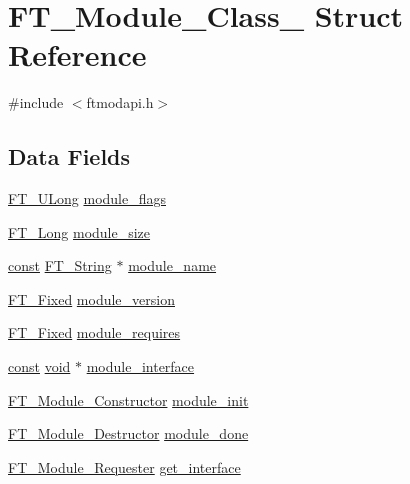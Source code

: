 \hypertarget{struct_f_t___module___class__}{}\section{F\+T\+\_\+\+Module\+\_\+\+Class\+\_\+ Struct Reference}
\label{struct_f_t___module___class__}


{\ttfamily \#include $<$ftmodapi.\+h$>$}

\subsection*{Data Fields}
\begin{DoxyCompactItemize}
\item 
\hyperlink{fttypes_8h_a4fac88bdba78eb76b505efa6e4fbf3f5}{F\+T\+\_\+\+U\+Long} \hyperlink{struct_f_t___module___class___a54a02a3767955cd8fa0cd786bd1f9515}{module\+\_\+flags}
\item 
\hyperlink{fttypes_8h_a7fa72a1f0e79fb1860c5965789024d6f}{F\+T\+\_\+\+Long} \hyperlink{struct_f_t___module___class___a2582eeab364e4fbbd5d1e420bfcf3207}{module\+\_\+size}
\item 
\hyperlink{zconf_8h_a2c212835823e3c54a8ab6d95c652660e}{const} \hyperlink{fttypes_8h_a9846214585359eb2ba6bbb0e6de30639}{F\+T\+\_\+\+String} $\ast$ \hyperlink{struct_f_t___module___class___af25b9e32b6c91e0c31560efb62886ed7}{module\+\_\+name}
\item 
\hyperlink{fttypes_8h_a5f5a679cc09f758efdd0d1c5feed3c3d}{F\+T\+\_\+\+Fixed} \hyperlink{struct_f_t___module___class___a5b649f1965c42fd8c54bbc370fbf60b4}{module\+\_\+version}
\item 
\hyperlink{fttypes_8h_a5f5a679cc09f758efdd0d1c5feed3c3d}{F\+T\+\_\+\+Fixed} \hyperlink{struct_f_t___module___class___a24772981bd972d342f54a6e1704f85c3}{module\+\_\+requires}
\item 
\hyperlink{zconf_8h_a2c212835823e3c54a8ab6d95c652660e}{const} \hyperlink{png_8h_ac9c84fa68bbad002983e35ce3663c686}{void} $\ast$ \hyperlink{struct_f_t___module___class___a320168f227e2d268691429ac0c6b2900}{module\+\_\+interface}
\item 
\hyperlink{ftmodapi_8h_ae0a0ec80683e4845d953fcbb7e6af093}{F\+T\+\_\+\+Module\+\_\+\+Constructor} \hyperlink{struct_f_t___module___class___a60f2bb9eee68366f20fe0613f347ffbd}{module\+\_\+init}
\item 
\hyperlink{ftmodapi_8h_a7881ad6a13b0fe28b8473fa7ee6f28c2}{F\+T\+\_\+\+Module\+\_\+\+Destructor} \hyperlink{struct_f_t___module___class___ab6e9c780519e24a51144df79692cf339}{module\+\_\+done}
\item 
\hyperlink{ftmodapi_8h_af078ba2b906d2553add818593ab784ed}{F\+T\+\_\+\+Module\+\_\+\+Requester} \hyperlink{struct_f_t___module___class___aa72d79fcd0991231e24e88f359244e8e}{get\+\_\+interface}
\end{DoxyCompactItemize}


